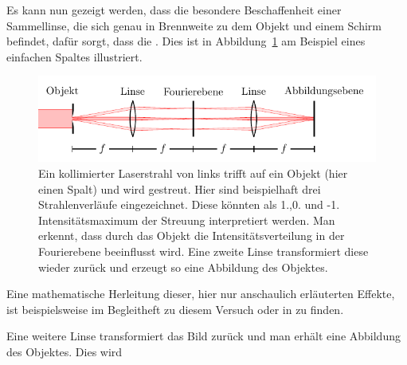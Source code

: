 Es kann nun gezeigt werden, dass die besondere Beschaffenheit einer Sammellinse, die sich genau in Brennweite zu dem Objekt und einem Schirm befindet, dafür sorgt, dass die  . Dies ist in Abbildung~\ref{fig:ft-an-linse} am Beispiel eines einfachen Spaltes illustriert. 

\begin{figure}[h]
	\centering
	\includegraphics[scale=1]{graphs/theorie/abbildung.pdf}
	\caption[Illustration: Inverse und Fouriertransformation an Linsen]{
		Ein kollimierter Laserstrahl von links trifft auf ein Objekt (hier einen Spalt) und wird gestreut. Hier sind beispielhaft drei Strahlenverläufe eingezeichnet. Diese könnten als 1.,0. und -1. Intensitätsmaximum der Streuung interpretiert werden. Man erkennt, dass durch das Objekt die Intensitätsverteilung in der Fourierebene beeinflusst wird. Eine zweite Linse transformiert diese wieder zurück und erzeugt so eine Abbildung des Objektes.
	} \label{fig:ft-an-linse}
\end{figure}

Eine mathematische Herleitung dieser, hier nur anschaulich erläuterten Effekte, ist beispielsweise im Begleitheft zu diesem Versuch oder in\cite{universitat_gottingen_lp_????} zu finden.


Eine weitere Linse transformiert das Bild zurück und man erhält eine Abbildung des Objektes. Dies wird 